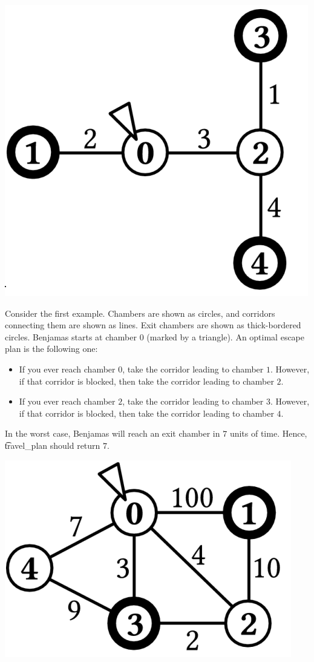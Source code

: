 \includegraphics{crocodile1.png}

Consider the first example. Chambers are shown as circles, and corridors connecting them are
shown as lines. Exit chambers are shown as thick-bordered circles.
Benjamas starts at chamber $0$ (marked by a triangle). An optimal
escape plan is the following one:
\begin{itemize}
\item If you ever reach chamber $0$, take the corridor leading to chamber $1$. However, if that corridor is blocked, then take the corridor leading to chamber $2$.
\item If you ever reach chamber $2$, take the corridor leading to chamber $3$. However, if that corridor is blocked, then take the corridor leading to chamber $4$.
\end{itemize}
In the worst case, Benjamas will reach an exit chamber in $7$ units of time. Hence, \t{travel\_plan}
should return $7$.

\includegraphics{crocodile2.png}

